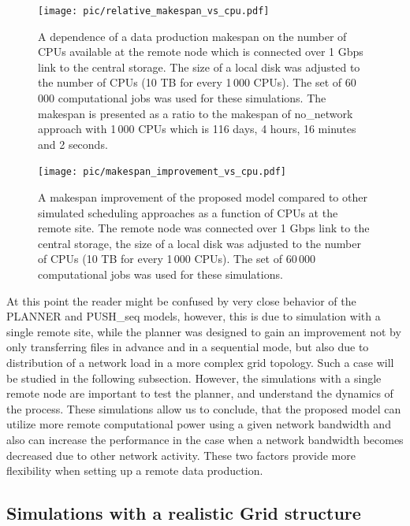 \documentclass{svjour3}                     %
\begin{document}
\begin{figure}
\centering
\begin{minipage}{1\textwidth}
\centering
    \texttt{[image: pic/relative\_makespan\_vs\_cpu.pdf]}
    \caption{A dependence of a data production makespan on the number of CPUs available at the remote node which is connected over 1 Gbps link to the central storage. The size of a local disk was adjusted to the number of CPUs (10 TB for every 1\,000 CPUs). The set of 60\,000 computational jobs was used for these simulations. The makespan is presented as a ratio to the makespan of no\_network approach with 1\,000 CPUs which is 116 days, 4 hours, 16 minutes and 2 seconds.}
    \label{relative_makespan_vs_cpu}
\end{minipage}\hspace{3mm}%

\begin{minipage}{1\textwidth}
\centering
    \texttt{[image: pic/makespan\_improvement\_vs\_cpu.pdf]}
    \caption{A makespan improvement of the proposed model compared to other simulated scheduling approaches as a function of CPUs at the remote site. The remote node was connected over 1 Gbps link to the central storage, the size of a local disk was adjusted to the number of CPUs (10 TB for every 1\,000 CPUs). The set of 60\,000 computational jobs was used for these simulations.}
    \label{makespan_improvement_vs_cpu}
\end{minipage} 
\end{figure}

At this point the reader might be confused by very close behavior of the PLANNER and PUSH\_seq models, however, this is due to simulation with a single remote site, while the planner was designed to gain an improvement not by only  transferring files in advance and in a sequential mode, but also due to distribution of a network load in a more complex grid topology. Such a case will be studied in the following subsection. However, the simulations with a single remote node are important to test the planner, and understand the dynamics of the process. These simulations allow us to conclude, that the proposed model can utilize more remote computational power using a given network bandwidth and also can increase the performance in the case when a network bandwidth becomes decreased due to other network activity. These two factors provide more flexibility when setting up a remote data production.


\subsection{Simulations with a realistic Grid structure}
\end{document}
